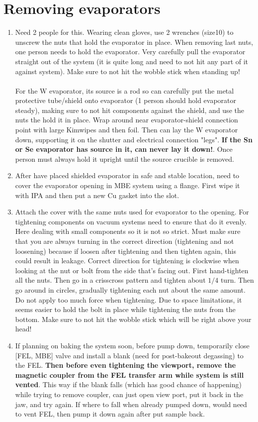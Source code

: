 \section{Removing evaporators}
\begin{enumerate}
\item	Need 2 people for this. Wearing clean gloves, use 2 wrenches (size10) to unscrew the nuts that hold the evaporator in place. When removing last nuts, one person needs to hold the evaporator. Very carefully pull the evaporator straight out of the system (it is quite long and need to not hit any part of it against system). Make sure to not hit the wobble stick when standing up! \\\\
For the W evaporator, its source is a rod so can carefully put the metal protective tube/shield onto evaporator (1 person should hold evaporator steady), making sure to not hit components against the shield, and use the nuts the hold it in place. Wrap around near evaporator-shield connection point with large Kimwipes and then foil. Then can lay the W evaporator down, supporting it on the shutter and electrical connection "legs". \textbf{If the Sn or Se evaporator has source in it, can never lay it down!}. Once person must always hold it upright until the source crucible is removed.
\item	After have placed shielded evaporator in safe and stable location, need to cover the evaporator opening in MBE system using a flange.  First wipe it with IPA and then put a new Cu gasket into the slot. 
\item	Attach the cover with the same nuts used for evaporator to the opening. For tightening components on vacuum systems need to ensure that do it evenly. Here dealing with small components so it is not so strict. Must make sure that you are always turning in the correct direction (tightening and not loosening) because if loosen after tightening and then tighten again, this could result in leakage. Correct direction for tightening is clockwise when looking at the nut or bolt from the side that’s facing out. First hand-tighten all the nuts. Then go in a crisscross pattern and tighten about $1/4$ turn. Then go around in circles, gradually tightening each nut about the same amount. Do not apply too much force when tightening. Due to space limitations, it seems easier to hold the bolt in place while tightening the nuts from the bottom. Make sure to not hit the wobble stick which will be right above your head!
\item If planning on baking the system soon, before pump down, temporarily close [FEL, MBE] valve and install a blank (need for post-bakeout degassing) to the FEL. \textbf{Then before even tightening the viewport, remove the magnetic coupler from the FEL transfer arm while system is still vented}. This way if the blank falls (which has good chance of happening) while trying to remove coupler, can just open view port, put it back in the jaw, and try  again. If where to fall when already pumped down, would need to vent FEL, then pump it down again after put sample back.

\end{enumerate}

